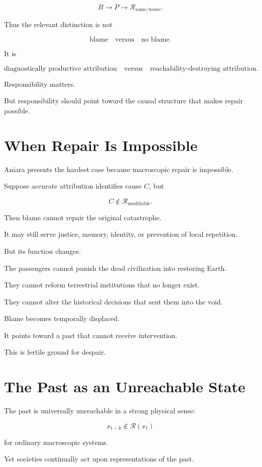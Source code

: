 \documentclass[11pt,oneside]{book}
\theoremstyle{definition}
\theoremstyle{remark}
\newcommand{\R}{\mathcal{R}}
\begin{document}
\[
B
\rightarrow
P
\rightarrow
\R_{\mathrm{same/worse}}.
\]

Thus the relevant distinction is not

\[
\text{blame}
\quad\text{versus}\quad
\text{no blame}.
\]

It is

\[
\text{diagnostically productive attribution}
\quad\text{versus}\quad
\text{reachability-destroying attribution}.
\]

Responsibility matters.

But responsibility should point toward the causal structure that makes repair possible.

\section{When Repair Is Impossible}

Aniara presents the hardest case because macroscopic repair is impossible.

Suppose accurate attribution identifies cause \(C\), but

\[
C\notin\R_{\mathrm{modifiable}}.
\]

Then blame cannot repair the original catastrophe.

It may still serve justice, memory, identity, or prevention of local repetition.

But its function changes.

The passengers cannot punish the dead civilization into restoring Earth.

They cannot reform terrestrial institutions that no longer exist.

They cannot alter the historical decisions that sent them into the void.

Blame becomes temporally displaced.

It points toward a past that cannot receive intervention.

This is fertile ground for despair.

\section{The Past as an Unreachable State}

The past is universally unreachable in a strong physical sense:

\[
x_{t-k}\notin\R(x_t)
\]

for ordinary macroscopic systems.

Yet societies continually act upon representations of the past.
\end{document}
